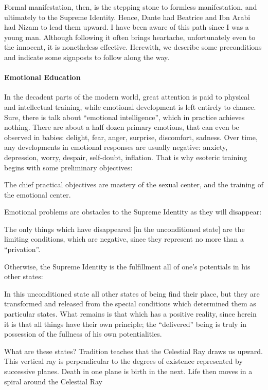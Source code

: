Formal manifestation, then, is the stepping stone to formless manifestation, and ultimately to the Supreme Identity. Hence, Dante had Beatrice and Ibn Arabi had Nizam to lead them upward. I have been aware of this path since I was a young man. Although following it often brings heartache, unfortunately even to the innocent, it is nonetheless effective. Herewith, we describe some preconditions and indicate some signposts to follow along the way.

\paragraph{Emotional Education}
In the decadent parts of the modern world, great attention is paid to physical and intellectual training, while emotional development is left entirely to chance. Sure, there is talk about “emotional intelligence”, which in practice achieves nothing. There are about a half dozen primary emotions, that can even be observed in babies: delight, fear, anger, surprise, discomfort, sadness. Over time, any developments in emotional responses are usually negative: anxiety, depression, worry, despair, self-doubt, inflation. That is why esoteric training begins with some preliminary objectives:

\begin{quotex}
The chief practical objectives are mastery of the sexual center, and the training of the emotional center. 

\end{quotex}
Emotional problems are obstacles to the Supreme Identity as they will disappear:

\begin{quotex}
The only things which have disappeared [in the unconditioned state] are the limiting conditions, which are negative, since they represent no more than a “privation”.  

\end{quotex}
Otherwise, the Supreme Identity is the fulfillment all of one's potentials in his other states:

\begin{quotex}
In this unconditioned state all other states of being ﬁnd their place, but they are transformed and released from the special conditions which determined them as particular states. What remains is that which has a positive reality, since herein it is that all things have their own principle; the “delivered” being is truly in possession of the fullness of his own potentialities. 

\end{quotex}
What are these states? Tradition teaches that the Celestial Ray draws us upward. This vertical ray is perpendicular to the degrees of existence represented by successive planes. Death in one plane is birth in the next. Life then moves in a spiral around the Celestial Ray

